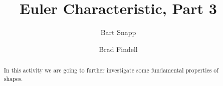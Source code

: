 \documentclass{ximera}
\title{Euler Characteristic, Part 3}
\author{Bart Snapp \and Brad Findell}
\begin{document}
\begin{abstract}
In this activity we are going to further investigate some fundamental
properties of shapes.
\end{abstract}
\maketitle


%
%
%
%
%
%
%
%
%
\end{document}
